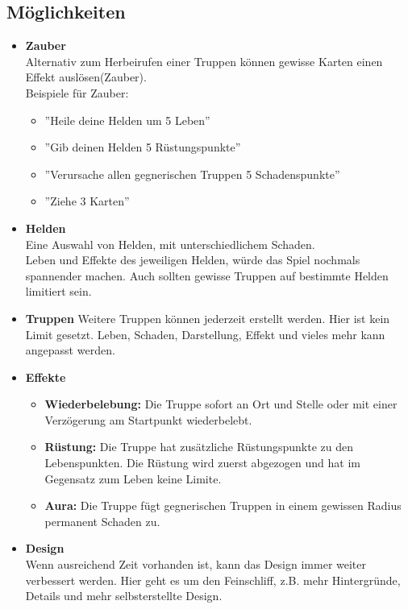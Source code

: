 \subsection{Möglichkeiten}
\begin{itemize}
    \item \textbf{Zauber} \\
        Alternativ zum Herbeirufen einer Truppen können gewisse Karten einen Effekt auslösen(Zauber).\\
        Beispiele für Zauber:
            \begin{itemize}
                \item ''Heile deine Helden um 5 Leben''
                \item ''Gib deinen Helden 5 Rüstungspunkte''
                \item ''Verursache allen gegnerischen Truppen 5 Schadenspunkte''
                \item ''Ziehe 3 Karten''
            \end{itemize}
    \item \textbf{Helden} \\
        Eine Auswahl von Helden, mit unterschiedlichem Schaden. \\Leben und Effekte des jeweiligen Helden, würde das Spiel nochmals spannender machen. Auch sollten gewisse Truppen auf bestimmte Helden limitiert sein. 
    \item \textbf{Truppen}
        Weitere Truppen können jederzeit erstellt werden. Hier ist kein Limit gesetzt. Leben, Schaden, Darstellung, Effekt und vieles mehr kann angepasst werden.
    \item \textbf{Effekte}
    \begin{itemize}
        \item \textbf{Wiederbelebung:}
            Die Truppe sofort an Ort und Stelle oder mit einer Verzögerung am Startpunkt wiederbelebt.
        \item \textbf{Rüstung:}
            Die Truppe hat zusätzliche Rüstungspunkte zu den Lebenspunkten. Die Rüstung wird zuerst abgezogen und hat im Gegensatz zum Leben keine Limite.
        \item \textbf{Aura:}
            Die Truppe fügt gegnerischen Truppen in einem gewissen Radius permanent Schaden zu.
    \end{itemize}
    \item \textbf{Design} \\
        Wenn ausreichend Zeit vorhanden ist, kann das Design immer weiter verbessert werden. Hier geht es um den Feinschliff, z.B. mehr Hintergründe, Details und mehr selbsterstellte Design.

\end{itemize}
